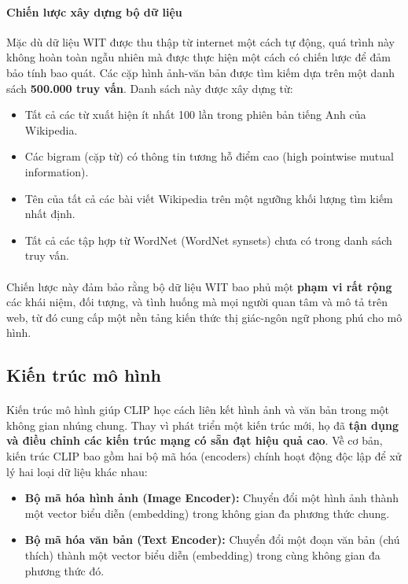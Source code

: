 \paragraph{Chiến lược xây dựng bộ dữ liệu}
Mặc dù dữ liệu WIT được thu thập từ internet một cách tự động, quá trình này không hoàn toàn ngẫu nhiên mà được thực hiện một cách có chiến lược để đảm bảo tính bao quát. Các cặp hình ảnh-văn bản được tìm kiếm dựa trên một danh sách \textbf{500.000 truy vấn}. Danh sách này được xây dựng từ:
\begin{itemize}
\item Tất cả các từ xuất hiện ít nhất 100 lần trong phiên bản tiếng Anh của Wikipedia.
\item Các bigram (cặp từ) có thông tin tương hỗ điểm cao (high pointwise mutual information).
\item Tên của tất cả các bài viết Wikipedia trên một ngưỡng khối lượng tìm kiếm nhất định.
\item Tất cả các tập hợp từ WordNet (WordNet synsets) chưa có trong danh sách truy vấn.
\end{itemize}
\paragraph{}{Chiến lược này đảm bảo rằng bộ dữ liệu WIT bao phủ một \textbf{phạm vi rất rộng} các khái niệm, đối tượng, và tình huống mà mọi người quan tâm và mô tả trên web, từ đó cung cấp một nền tảng kiến thức thị giác-ngôn ngữ phong phú cho mô hình.}


\subsection{Kiến trúc mô hình}
\paragraph{}{Kiến trúc mô hình giúp CLIP học cách liên kết hình ảnh và văn bản trong một không gian nhúng chung. Thay vì phát triển một kiến trúc mới, họ đã \textbf{tận dụng và điều chỉnh các kiến trúc mạng có sẵn đạt hiệu quả cao}.
Về cơ bản, kiến trúc CLIP bao gồm hai bộ mã hóa (encoders) chính hoạt động độc lập để xử lý hai loại dữ liệu khác nhau:}
\begin{itemize}
\item \textbf{Bộ mã hóa hình ảnh (Image Encoder):} Chuyển đổi một hình ảnh thành một vector biểu diễn (embedding) trong không gian đa phương thức chung.
\item \textbf{Bộ mã hóa văn bản (Text Encoder):} Chuyển đổi một đoạn văn bản (chú thích) thành một vector biểu diễn (embedding) trong cùng không gian đa phương thức đó.
\end{itemize}

